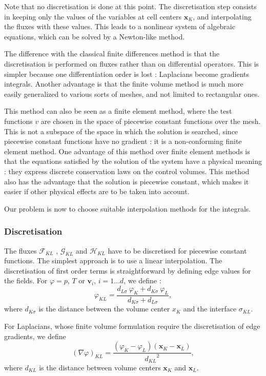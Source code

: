 \documentclass[12pt]{article}
\newcommand{\vb}[1]{\ensuremath{\boldsymbol #1}}
\begin{document}
Note that no discretisation is done at this point. The discretisation
step consists in keeping only the values of the variables at cell
centers $\vb{x}_K$, and interpolating the fluxes with these
values. This leads to a nonlinear system of algebraic equations, which
can be solved by a Newton-like method.

The difference with the classical finite differences method is that
the discretisation is performed on fluxes rather than on differential
operators. This is simpler because one differentiation order is lost :
Laplacians become gradients integrals. Another advantage is that the
finite volume method is much more easily generalized to various sorts
of meshes, and not limited to rectangular ones.

This method can also be seen as a finite element method, where the
test functions $v$ are chosen in the space of piecewise constant
functions over the mesh. This is not a subspace of the space in which
the solution is searched, since piecewise constant functions have no
gradient : it is a non-conforming finite element method. One advantage
of this method over finite element methods is that the equations
satisfied by the solution of the system have a physical meaning : they
express discrete conservation laws on the control volumes. This method
also has the advantage that the solution is piecewise constant, which
makes it easier if other physical effects are to be taken into
account.

Our problem is now to choose suitable interpolation methods for the
integrals.
\subsubsection{Discretisation}
The fluxes $\mathcal F_{KL}$ , $\mathcal G_{KL}$ and $\mathcal H_{KL}$
have to be discretised for piecewise constant functions. The simplest
approach is to use a linear interpolation. The discretisation of first
order terms is straightforward by defining edge values for the
fields. For $\varphi = p$, $T$ or $\vb{v_{i}}$, $i = 1 \dots d$, we
define :  $$\varphi_{KL} = \frac{d_{L\sigma} \ \varphi_{K} +
  d_{K\sigma} \ \varphi_{L}}{d_{K\sigma} + d_{L\sigma}},$$ where $d_{K
  \sigma}$ is the distance between the volume center $x_{K}$ and the
interface $\sigma_{KL}$.

For Laplacians, whose finite volume formulation require the
discretisation of edge gradients, we define $$(\nabla \varphi)_{KL} =
\frac{(\varphi_{K} - \varphi_{L}) (\vb{x}_{K} - \vb{x_{L}})}
{{d_{KL}}^{2}},$$ where $d_{KL}$ is the distance between volume
centers $\vb{x}_{K}$ and $\vb{x}_{L}$.
\end{document}
